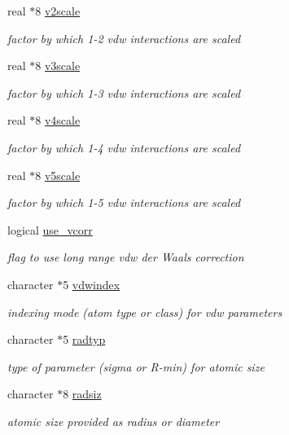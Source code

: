 \begin{DoxyCompactItemize}
real $\ast$8 \hyperlink{classvdwpot_a571a8d4ecd0f85976b361c08cb999e18}{v2scale}
\begin{DoxyCompactList}\small\item\em factor by which 1-\/2 vdw interactions are scaled \end{DoxyCompactList}\item 
real $\ast$8 \hyperlink{classvdwpot_aaa31f7b4139ddd393d12932d89e63c32}{v3scale}
\begin{DoxyCompactList}\small\item\em factor by which 1-\/3 vdw interactions are scaled \end{DoxyCompactList}\item 
real $\ast$8 \hyperlink{classvdwpot_aa8a0d70d0b0a4d7aca0f8ac9fc33e62d}{v4scale}
\begin{DoxyCompactList}\small\item\em factor by which 1-\/4 vdw interactions are scaled \end{DoxyCompactList}\item 
real $\ast$8 \hyperlink{classvdwpot_a7c49d57b6764a554052c00b221c88640}{v5scale}
\begin{DoxyCompactList}\small\item\em factor by which 1-\/5 vdw interactions are scaled \end{DoxyCompactList}\item 
logical \hyperlink{classvdwpot_af974466e0dc234aa8a97ab288eb69c73}{use\-\_\-vcorr}
\begin{DoxyCompactList}\small\item\em flag to use long range vdw der Waals correction \end{DoxyCompactList}\item 
character $\ast$5 \hyperlink{classvdwpot_a82c07ae824098ad7dcab3a4b36470f4c}{vdwindex}
\begin{DoxyCompactList}\small\item\em indexing mode (atom type or class) for vdw parameters \end{DoxyCompactList}\item 
character $\ast$5 \hyperlink{classvdwpot_a976399d6ca4204cc92e4e5210f3a6e7a}{radtyp}
\begin{DoxyCompactList}\small\item\em type of parameter (sigma or R-\/min) for atomic size \end{DoxyCompactList}\item 
character $\ast$8 \hyperlink{classvdwpot_a3049138d7e172d8f06fece6c7640eb75}{radsiz}
\begin{DoxyCompactList}\small\item\em atomic size provided as radius or diameter \end{DoxyCompactList}\item 

\end{DoxyCompactItemize}

